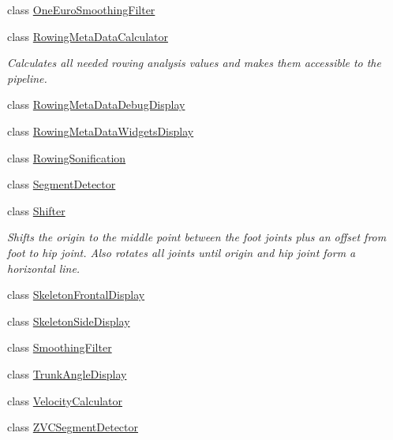 \begin{DoxyCompactItemize}
\item 
class \hyperlink{class_rowing_monitor_1_1_model_1_1_pipeline_1_1_one_euro_smoothing_filter}{One\+Euro\+Smoothing\+Filter}
\item 
class \hyperlink{class_rowing_monitor_1_1_model_1_1_pipeline_1_1_rowing_meta_data_calculator}{Rowing\+Meta\+Data\+Calculator}
\begin{DoxyCompactList}\small\item\em Calculates all needed rowing analysis values and makes them accessible to the pipeline. \end{DoxyCompactList}\item 
class \hyperlink{class_rowing_monitor_1_1_model_1_1_pipeline_1_1_rowing_meta_data_debug_display}{Rowing\+Meta\+Data\+Debug\+Display}
\item 
class \hyperlink{class_rowing_monitor_1_1_model_1_1_pipeline_1_1_rowing_meta_data_widgets_display}{Rowing\+Meta\+Data\+Widgets\+Display}
\item 
class \hyperlink{class_rowing_monitor_1_1_model_1_1_pipeline_1_1_rowing_sonification}{Rowing\+Sonification}
\item 
class \hyperlink{class_rowing_monitor_1_1_model_1_1_pipeline_1_1_segment_detector}{Segment\+Detector}
\item 
class \hyperlink{class_rowing_monitor_1_1_model_1_1_pipeline_1_1_shifter}{Shifter}
\begin{DoxyCompactList}\small\item\em Shifts the origin to the middle point between the foot joints plus an offset from foot to hip joint. Also rotates all joints until origin and hip joint form a horizontal line. \end{DoxyCompactList}\item 
class \hyperlink{class_rowing_monitor_1_1_model_1_1_pipeline_1_1_skeleton_frontal_display}{Skeleton\+Frontal\+Display}
\item 
class \hyperlink{class_rowing_monitor_1_1_model_1_1_pipeline_1_1_skeleton_side_display}{Skeleton\+Side\+Display}
\item 
class \hyperlink{class_rowing_monitor_1_1_model_1_1_pipeline_1_1_smoothing_filter}{Smoothing\+Filter}
\item 
class \hyperlink{class_rowing_monitor_1_1_model_1_1_pipeline_1_1_trunk_angle_display}{Trunk\+Angle\+Display}
\item 
class \hyperlink{class_rowing_monitor_1_1_model_1_1_pipeline_1_1_velocity_calculator}{Velocity\+Calculator}
\item 
class \hyperlink{class_rowing_monitor_1_1_model_1_1_pipeline_1_1_z_v_c_segment_detector}{Z\+V\+C\+Segment\+Detector}
\end{DoxyCompactItemize}
